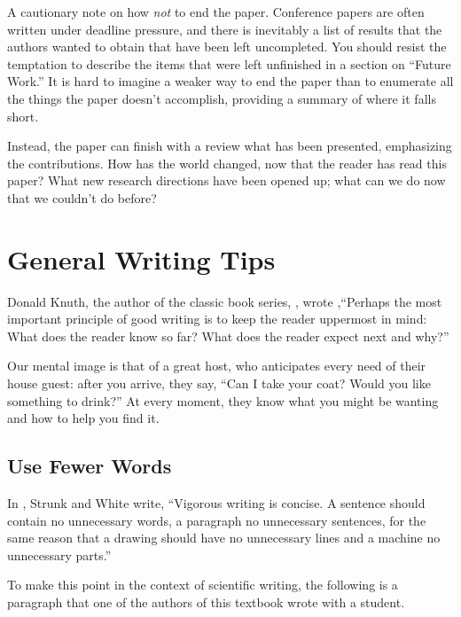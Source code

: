 A cautionary note on how {\em not} to end the paper.  Conference papers are often written under deadline pressure, and there is inevitably a list of results that the authors wanted to obtain that have been left uncompleted.  You should resist the temptation to describe the items that were left unfinished in a section on ``Future Work.''  It is hard to imagine a weaker way to end the paper than to enumerate all the things the paper doesn't accomplish, providing a summary of where it falls short.

Instead, the paper can finish with a review what has been presented, emphasizing the contributions.  How has the world changed, now that the reader has read this paper?  What new research directions have been opened up;  what can we do now that we couldn't do before?

\section{General Writing Tips}

Donald Knuth, the author of the classic book series, , wrote \cite{Knuth1989},``Perhaps the most important principle of good writing is to keep the reader uppermost in mind:  What does the reader know so far?  What does the reader expect next and why?''

Our mental image is that of a great host, who anticipates every need of their house guest: after you arrive, they say, ``Can I take your coat?  Would you like something to drink?''  At every moment, they know what you might be wanting and how to help you find it.

\subsection{Use Fewer Words}

In  \cite{Strunk}, Strunk and White write, ``Vigorous writing is concise.  A sentence should contain no unnecessary words, a paragraph no unnecessary sentences, for the same reason that a drawing should have no unnecessary lines and a machine no unnecessary parts.''

To make this point in the context of scientific writing, the following is a paragraph that one of the authors of this textbook wrote with a student.


